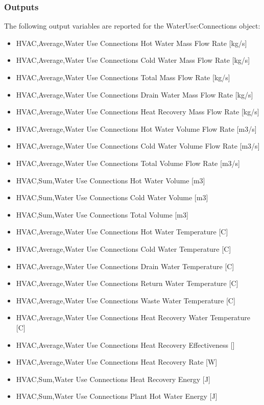 \subsubsection{Outputs}\label{outputs-1-031}

The following output variables are reported for the WaterUse:Connections object:

\begin{itemize}
\item
  HVAC,Average,Water Use Connections Hot Water Mass Flow Rate {[}kg/s{]}
\item
  HVAC,Average,Water Use Connections Cold Water Mass Flow Rate {[}kg/s{]}
\item
  HVAC,Average,Water Use Connections Total Mass Flow Rate {[}kg/s{]}
\item
  HVAC,Average,Water Use Connections Drain Water Mass Flow Rate {[}kg/s{]}
\item
  HVAC,Average,Water Use Connections Heat Recovery Mass Flow Rate {[}kg/s{]}
\item
  HVAC,Average,Water Use Connections Hot Water Volume Flow Rate {[}m3/s{]}
\item
  HVAC,Average,Water Use Connections Cold Water Volume Flow Rate {[}m3/s{]}
\item
  HVAC,Average,Water Use Connections Total Volume Flow Rate {[}m3/s{]}
\item
  HVAC,Sum,Water Use Connections Hot Water Volume {[}m3{]}
\item
  HVAC,Sum,Water Use Connections Cold Water Volume {[}m3{]}
\item
  HVAC,Sum,Water Use Connections Total Volume {[}m3{]}
\item
  HVAC,Average,Water Use Connections Hot Water Temperature {[}C{]}
\item
  HVAC,Average,Water Use Connections Cold Water Temperature {[}C{]}
\item
  HVAC,Average,Water Use Connections Drain Water Temperature {[}C{]}
\item
  HVAC,Average,Water Use Connections Return Water Temperature {[}C{]}
\item
  HVAC,Average,Water Use Connections Waste Water Temperature {[}C{]}
\item
  HVAC,Average,Water Use Connections Heat Recovery Water Temperature {[}C{]}
\item
  HVAC,Average,Water Use Connections Heat Recovery Effectiveness {[]}
\item
  HVAC,Average,Water Use Connections Heat Recovery Rate {[}W{]}
\item
  HVAC,Sum,Water Use Connections Heat Recovery Energy {[}J{]}
\item
  HVAC,Sum,Water Use Connections Plant Hot Water Energy {[}J{]}
\end{itemize}


